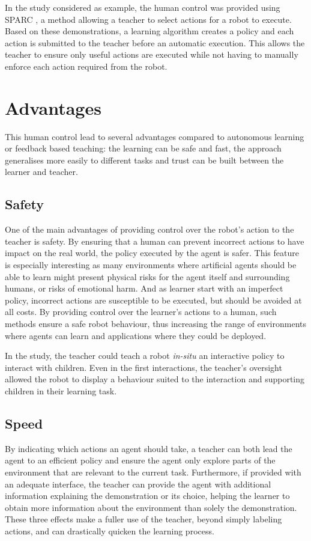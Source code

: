 \documentclass[letterpaper, 10 pt, conference]{ieeeconf}  %
\begin{document}
In the study considered as example, the human control was provided using SPARC \cite{senft2015sparc}, a method allowing a teacher to select actions for a robot to execute. Based on these demonstrations, a learning algorithm creates a policy and each action is submitted to the teacher before an automatic execution. This allows the teacher to ensure only useful actions are executed while not having to manually enforce each action required from the robot. 

\section{Advantages}
This human control lead to several advantages compared to autonomous learning or feedback based teaching: the learning can be safe and fast, the approach generalises more easily to different tasks and trust can be built between the learner and teacher. 

\subsection{Safety}
One of the main advantages of providing control over the robot's action to the teacher is safety. By ensuring that a human can prevent incorrect actions to have impact on the real world, the policy executed by the agent is safer. This feature is especially interesting as many environments where artificial agents should be able to learn might present physical risks for the agent itself and surrounding humans, or risks of emotional harm. And as learner start with an imperfect policy, incorrect actions are susceptible to be executed, but should be avoided at all costs. By providing control over the learner's actions to a human, such methods ensure a safe robot behaviour, thus increasing the range of environments where agents can learn and applications where they could be deployed.

In the study, the teacher could teach a robot \textit{in-situ} an interactive policy to interact with children. Even in the first interactions, the teacher's oversight allowed the robot to display a behaviour suited to the interaction and supporting children in their learning task.

\subsection{Speed}
By indicating which actions an agent should take, a teacher can both lead the agent to an efficient policy and ensure the agent only explore parts of the environment that are relevant to the current task. Furthermore, if provided with an adequate interface, the teacher can provide the agent with additional information explaining the demonstration or its choice, helping the learner to obtain more information about the environment than solely the demonstration. These three effects make a fuller use of the teacher, beyond simply labeling actions, and can drastically quicken the learning process.
\end{document}
